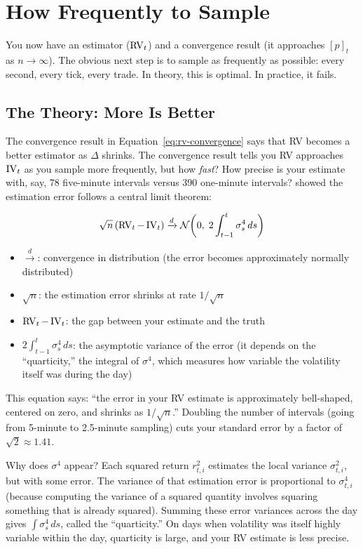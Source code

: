 \section{How Frequently to Sample}
\label{sec:sampling-frequency}

You now have an estimator ($\operatorname{RV}_t$) and a convergence result (it approaches $[p]_t$ as $n \to \infty$).
The obvious next step is to sample as frequently as possible: every second, every tick, every trade.
In theory, this is optimal.
In practice, it fails.

\subsection{The Theory: More Is Better}

The convergence result in Equation~\eqref{eq:rv-convergence} says that RV becomes a better estimator as $\Delta$ shrinks.
The convergence result tells you RV approaches $\operatorname{IV}_t$ as you sample more frequently, but how \emph{fast}? How precise is your estimate with, say, 78 five-minute intervals versus 390 one-minute intervals? \citet{BNS2002} showed the estimation error follows a central limit theorem:

\begin{equation}
  \sqrt{n}\,(\operatorname{RV}_t - \operatorname{IV}_t) \xrightarrow{d} \mathcal{N}\!\left(0,\; 2\int_{t-1}^{t}\sigma^4_s\,ds\right)
  \label{eq:rv-clt}
\end{equation}
\begin{itemize}[nosep]
  \item $\xrightarrow{d}$: convergence in distribution (the error becomes approximately normally distributed)
  \item $\sqrt{n}$: the estimation error shrinks at rate $1/\sqrt{n}$
  \item $\operatorname{RV}_t - \operatorname{IV}_t$: the gap between your estimate and the truth
  \item $2\int_{t-1}^{t}\sigma^4_s\,ds$: the asymptotic variance of the error (it depends on the ``quarticity,'' the integral of $\sigma^4$, which measures how variable the volatility itself was during the day)
\end{itemize}

\begin{intuition}
This equation says: ``the error in your RV estimate is approximately bell-shaped, centered on zero, and shrinks as $1/\sqrt{n}$.''
Doubling the number of intervals (going from 5-minute to 2.5-minute sampling) cuts your standard error by a factor of $\sqrt{2} \approx 1.41$.

Why does $\sigma^4$ appear?
Each squared return $r^2_{t,i}$ estimates the local variance $\sigma^2_{t,i}$, but with some error.
The variance of that estimation error is proportional to $\sigma^4_{t,i}$ (because computing the variance of a squared quantity involves squaring something that is already squared).
Summing these error variances across the day gives $\int \sigma^4_s\,ds$, called the ``quarticity.''
On days when volatility was itself highly variable within the day, quarticity is large, and your RV estimate is less precise.
\end{intuition}


